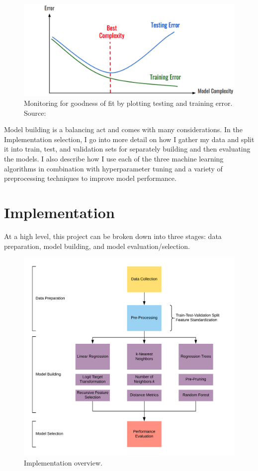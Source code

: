 \documentclass[pageno]{jpaper}
\begin{document}
\begin{figure}[hbt]
\centering
\includegraphics[width=0.75\linewidth]{traintest.png}
\caption{Monitoring for goodness of fit by plotting testing and training error.\\
Source: \cite{traintest}}
\label{fig:traintest}
\end{figure}

Model building is a balancing act and comes with many considerations. In the Implementation selection, I go into more detail on how I gather my data and split it into train, test, and validation sets for separately building and then evaluating the models. I also describe how I use each of the three machine learning algorithms in combination with hyperparameter tuning and a variety of preprocessing techniques to improve model performance.

\section{Implementation}

At a high level, this project can be broken down into three stages: data preparation, model building, and model evaluation/selection.

\begin{figure}[hbt]
\centering
\includegraphics[width=0.75\linewidth]{implementation.png}
\caption{Implementation overview.}
\label{fig:implementation}
\end{figure}
\end{document}
